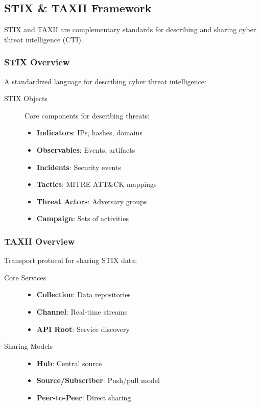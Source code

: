 \subsection{}
\begin{center}
\end{center}

\subsection{STIX \& TAXII Framework}
STIX and TAXII are complementary standards for describing and sharing cyber threat intelligence (CTI).

\subsubsection{STIX Overview}
A standardized language for describing cyber threat intelligence:

\begin{description}
    \item[STIX Objects] Core components for describing threats:
    \begin{itemize}
        \item \textbf{Indicators}: IPs, hashes, domains
        \item \textbf{Observables}: Events, artifacts
        \item \textbf{Incidents}: Security events
        \item \textbf{Tactics}: MITRE ATT\&CK mappings
        \item \textbf{Threat Actors}: Adversary groups
        \item \textbf{Campaign}: Sets of activities
    \end{itemize}
\end{description}

\subsubsection{TAXII Overview}
Transport protocol for sharing STIX data:

\begin{description}
    \item[Core Services]
    \begin{itemize}
        \item \textbf{Collection}: Data repositories
        \item \textbf{Channel}: Real-time streams
        \item \textbf{API Root}: Service discovery
    \end{itemize}
    
    \item[Sharing Models]
    \begin{itemize}
        \item \textbf{Hub}: Central source
        \item \textbf{Source/Subscriber}: Push/pull model
        \item \textbf{Peer-to-Peer}: Direct sharing
    \end{itemize}
\end{description}

